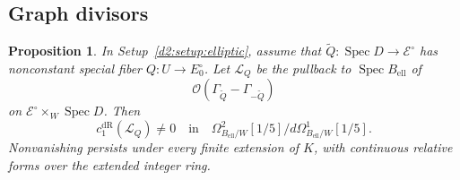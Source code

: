 \documentclass[11pt,a4paper]{amsart}
\numberwithin{equation}{section}
\newtheorem{proposition}[theorem]{Proposition}
\theoremstyle{definition}
\theoremstyle{remark}
\newcommand{\DtwocO}{\mathcal O}
\newcommand{\DtwocE}{\mathcal E}
\newcommand{\DtwocL}{\mathcal L}
\newcommand{\Dtwowt}{\widetilde}
\newcommand{\DtwodR}{\mathrm{dR}}
\newcommand{\DtwoSpec}{\operatorname{Spec}}
\begin{document}
\subsection{Graph divisors}

\begin{proposition}\label{d2:prop:graph}
In Setup~\ref{d2:setup:elliptic}, assume that
\(\Dtwowt Q\colon\DtwoSpec D\to\DtwocE^\circ\) has nonconstant special fiber
\(Q\colon U\to E_0^\circ\).
Let \(\DtwocL_Q\) be the pullback to \(\DtwoSpec B_{\mathrm{ell}}\) of
\[
 \DtwocO(\Gamma_{\Dtwowt Q}-\Gamma_{-\Dtwowt Q})
\]
on \(\DtwocE^\circ\times_W\DtwoSpec D\).
Then
\[
 c_1^\DtwodR(\DtwocL_Q)\ne0
 \quad\text{in}\quad
 \Omega^2_{B_{\mathrm{ell}}/W}[1/5]\big/
       d\Omega^1_{B_{\mathrm{ell}}/W}[1/5].
\]
Nonvanishing persists under every finite extension of \(K\), with
continuous relative forms over the extended integer ring.
\end{proposition}
\end{document}
